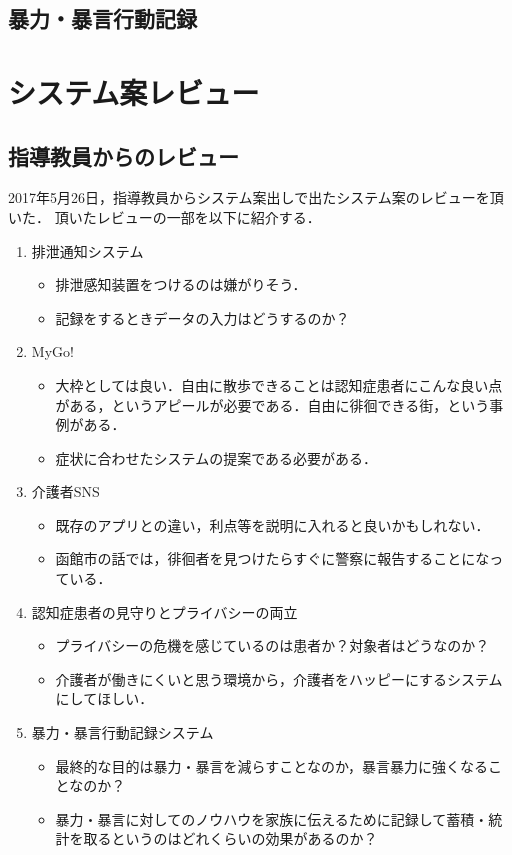 \documentclass[../report]{subfiles}
\begin{document}
\subsection{暴力・暴言行動記録}



\section{システム案レビュー}
\subsection{指導教員からのレビュー}
2017年5月26日，指導教員からシステム案出しで出たシステム案のレビューを頂いた．
頂いたレビューの一部を以下に紹介する．
\begin{enumerate}
    \item 排泄通知システム
        \begin{itemize}
            \item 排泄感知装置をつけるのは嫌がりそう．
            \item 記録をするときデータの入力はどうするのか？
        \end{itemize}
    \item MyGo!
        \begin{itemize}
            \item 大枠としては良い．自由に散歩できることは認知症患者にこんな良い点がある，というアピールが必要である．自由に徘徊できる街，という事例がある\cite{haikai}．
            \item 症状に合わせたシステムの提案である必要がある．
        \end{itemize}
    \item 介護者SNS
        \begin{itemize}
            \item 既存のアプリとの違い，利点等を説明に入れると良いかもしれない．
            \item 函館市の話では，徘徊者を見つけたらすぐに警察に報告することになっている．
        \end{itemize}
    \item 認知症患者の見守りとプライバシーの両立
        \begin{itemize}
            \item プライバシーの危機を感じているのは患者か？対象者はどうなのか？
            \item 介護者が働きにくいと思う環境から，介護者をハッピーにするシステムにしてほしい．
        \end{itemize}
    \item 暴力・暴言行動記録システム
        \begin{itemize}
            \item 最終的な目的は暴力・暴言を減らすことなのか，暴言暴力に強くなることなのか？
            \item 暴力・暴言に対してのノウハウを家族に伝えるために記録して蓄積・統計を取るというのはどれくらいの効果があるのか？
        \end{itemize}
\end{enumerate}
\end{document}
